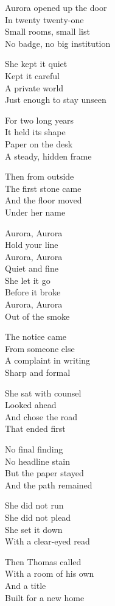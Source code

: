 \begin{lyrics}
Aurora opened up the door\\
In twenty twenty-one\\
Small rooms, small list\\
No badge, no big institution

She kept it quiet\\
Kept it careful\\
A private world\\
Just enough to stay unseen

For two long years\\
It held its shape\\
Paper on the desk\\
A steady, hidden frame

Then from outside\\
The first stone came\\
And the floor moved\\
Under her name

Aurora, Aurora\\
Hold your line\\
Aurora, Aurora\\
Quiet and fine\\
She let it go\\
Before it broke\\
Aurora, Aurora\\
Out of the smoke

The notice came\\
From someone else\\
A complaint in writing\\
Sharp and formal

She sat with counsel\\
Looked ahead\\
And chose the road\\
That ended first

No final finding\\
No headline stain\\
But the paper stayed\\
And the path remained

She did not run\\
She did not plead\\
She set it down\\
With a clear-eyed read

Then Thomas called\\
With a room of his own\\
And a title\\
Built for a new home


\end{lyrics}
